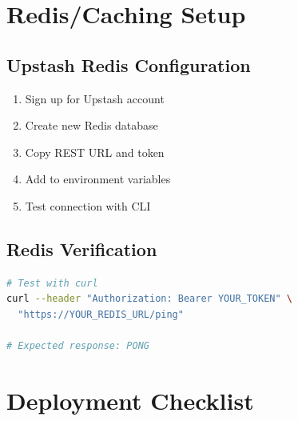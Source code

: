\documentclass[12pt,a4paper]{report}
\begin{document}
\section{Redis/Caching Setup}

\subsection{Upstash Redis Configuration}

\begin{enumerate}
    \item Sign up for Upstash account
    \item Create new Redis database
    \item Copy REST URL and token
    \item Add to environment variables
    \item Test connection with CLI
\end{enumerate}

\subsection{Redis Verification}

\begin{lstlisting}[language=bash, caption=Redis Connection Test]
# Test with curl
curl --header "Authorization: Bearer YOUR_TOKEN" \
  "https://YOUR_REDIS_URL/ping"

# Expected response: PONG
\end{lstlisting}

\section{Deployment Checklist}
\end{document}
